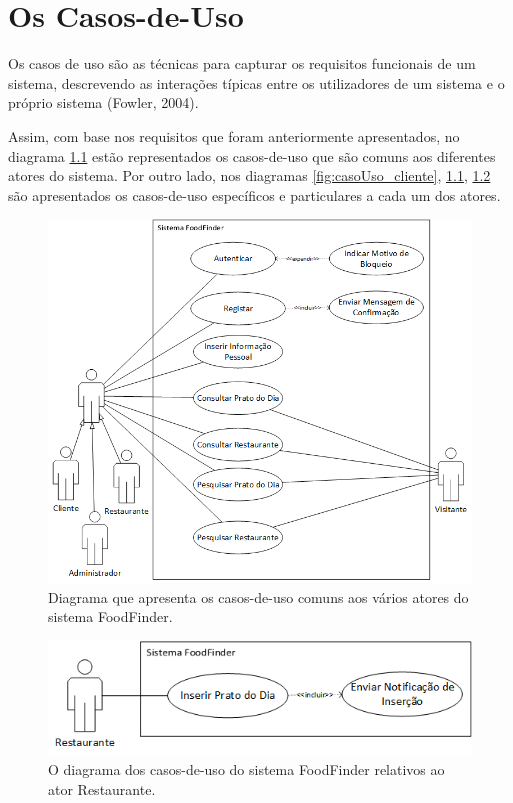 \documentclass[a4paper,12pt]{report}
\begin{document}
\chapter{Os Casos-de-Uso}	

	Os casos de uso são as técnicas para capturar os requisitos funcionais de um sistema, descrevendo as interações típicas entre os utilizadores de um sistema e o próprio sistema (Fowler, 2004).

	Assim, com base nos requisitos que foram anteriormente apresentados, no diagrama \ref{fig:casoUso_comum} estão representados os casos-de-uso que são comuns aos diferentes atores do sistema. Por outro lado, nos diagramas \ref{fig:casoUso_cliente}, \ref{fig:casoUso_comum}, \ref{fig:casoUso_restaurante} são apresentados os casos-de-uso específicos e particulares a cada um dos atores.
	
	
	\begin{figure}[H]
	\begin{center}
	\includegraphics[scale=0.68]{casoUso_comum}	
	\end{center}
	\medskip
	\caption{Diagrama que apresenta os casos-de-uso comuns aos vários atores do sistema FoodFinder.}
	\label{fig:casoUso_comum}	
	\end{figure}
	
	\begin{figure}[H]
	\begin{center}
	\includegraphics[scale=0.70]{casoUso_restaurante}	
	\end{center}
	\medskip
	\caption{O diagrama dos casos-de-uso do sistema FoodFinder relativos ao ator Restaurante.}
	\label{fig:casoUso_restaurante}	
	\end{figure}
	
\end{document}
